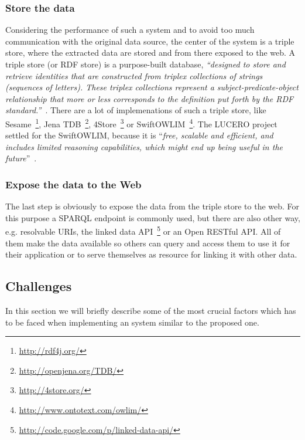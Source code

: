 {\subsubsection{Store the data}\label{subsubsec:store}
Considering the performance of such a system and to avoid too much communication with the original data source, the center of the system is a triple store, where the extracted data are stored and from there exposed to the web. A triple store (or RDF store) is a purpose-built database, \textit{"`designed to store and retrieve identities that are constructed from triplex collections of strings (sequences of letters). These triplex collections represent a subject-predicate-object relationship that more or less corresponds to the definition put forth by the RDF standard."'}~\citet{url:triplestore}. There are a lot of implemenations of such a triple store, like 
Sesame~\footnote{\url{http://rdf4j.org/}}, 
Jena TDB~\footnote{\url{http://openjena.org/TDB/}}, 
4Store~\footnote{\url{http://4store.org/}} or 
SwiftOWLIM~\footnote{\url{http://www.ontotext.com/owlim/}}. The LUCERO project settled for the SwiftOWLIM, because it is "`\textit{free, scalable and efficient, and includes limited reasoning capabilities, which might end up being useful in the future}"'~\citet{url:lucero-tabloid}.

\subsubsection{Expose the data to the Web}\label{subsubsec:provision}
The last step is obviously to expose the data from the triple store to the web. For this purpose a SPARQL endpoint is commonly used, but there are also other way, e.g. resolvable URIs, the linked data API~\footnote{\url{http://code.google.com/p/linked-data-api/}} or an Open RESTful API. All of them make the data available so others can query and access them to use it for their application or to serve themselves as resource for linking it with other data.

\subsection{Challenges}
In this section we will briefly describe some of the most crucial factors which has to be faced when implementing an system similar to the proposed one.

}
